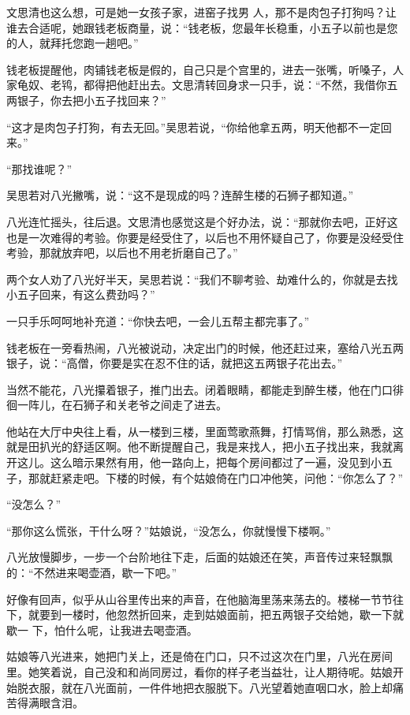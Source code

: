 文思清也这么想，可是她一女孩子家，进窑子找男
人，那不是肉包子打狗吗？让谁去合适呢，她跟钱老板商量，说：“钱老板，您最年长稳重，小五子以前也是您的人，就拜托您跑一趟吧。”

钱老板提醒他，肉铺钱老板是假的，自己只是个宫里的，进去一张嘴，听嗓子，人家龟奴、老鸨，都得把他赶出去。文思清转回身求一只手，说：“不然，我借你五两银子，你去把小五子找回来？”

“这才是肉包子打狗，有去无回。”吴思若说，“你给他拿五两，明天他都不一定回来。”

“那找谁呢？”

吴思若对八光撇嘴，说：“这不是现成的吗？连醉生楼的石狮子都知道。”

八光连忙摇头，往后退。文思清也感觉这是个好办法，说：“那就你去吧，正好这也是一次难得的考验。你要是经受住了，以后也不用怀疑自己了，你要是没经受住考验，那就放弃吧，以后也不用老折磨自己了。”

两个女人劝了八光好半天，吴思若说：“我们不聊考验、劫难什么的，你就是去找小五子回来，有这么费劲吗？”

一只手乐呵呵地补充道：“你快去吧，一会儿五帮主都完事了。”

钱老板在一旁看热闹，八光被说动，决定出门的时候，他还赶过来，塞给八光五两银子，说：“高僧，你要是实在忍不住的话，就把这五两银子花出去。”

当然不能花，八光攥着银子，推门出去。闭着眼睛，都能走到醉生楼，他在门口徘徊一阵儿，在石狮子和关老爷之间走了进去。

他站在大厅中央往上看，从一楼到三楼，里面莺歌燕舞，打情骂俏，那么熟悉，这就是田扒光的舒适区啊。他不断提醒自己，我是来找人，把小五子找出来，我就离开这儿。这么暗示果然有用，他一路向上，把每个房间都过了一遍，没见到小五子，那就赶紧走吧。下楼的时候，有个姑娘倚在门口冲他笑，问他：“你怎么了？”

“没怎么？”

“那你这么慌张，干什么呀？”姑娘说，“没怎么，你就慢慢下楼啊。”

八光放慢脚步，一步一个台阶地往下走，后面的姑娘还在笑，声音传过来轻飘飘的：“不然进来喝壶酒，歇一下吧。”

好像有回声，似乎从山谷里传出来的声音，在他脑海里荡来荡去的。楼梯一节节往下，就要到一楼时，他忽然折回来，走到姑娘面前，把五两银子交给她，歇一下就歇一
下，怕什么呢，让我进去喝壶酒。

姑娘等八光进来，她把门关上，还是倚在门口，只不过这次在门里，八光在房间里。她笑着说，自己没和和尚同房过，看你的样子老当益壮，让人期待呢。姑娘开始脱衣服，就在八光面前，一件件地把衣服脱下。八光望着她直咽口水，脸上却痛苦得满眼含泪。

